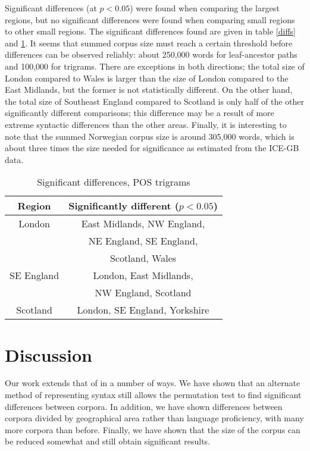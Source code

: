 \documentclass[11pt]{article}
\begin{document}
Significant differences (at $p < 0.05$) were found when
comparing the largest regions, but no significant differences were
found when comparing small regions to other small regions. The
significant differences found are given in table \ref{diffs} and
\ref{trigramdiffs}. It seems that summed corpus size must reach a
certain threshold before differences can be observed reliably: about 250,000
words for leaf-ancestor paths and 100,000 for trigrams. There are exceptions in
both directions; the total size of London compared to Wales is larger than
the size of  London
compared to the East Midlands, but the former is not statistically different.
On the other hand, the total size of Southeast England compared to
Scotland is only half of the other significantly different comparisons; this
difference may be a result of
more extreme syntactic differences than the other areas.
Finally, it is interesting to note that the summed Norwegian corpus
size is around 305,000 words, which is about three times the size needed
for significance as estimated from the ICE-GB data.

\begin{table}
  \begin{tabular}{|c|c|} \hline %
    Region & Significantly different ($p < 0.05$) \\ \hline
    London & East Midlands, NW England, \\
    & NE England, SE England,\\
    & Scotland, Wales \\ \hline
    SE England & London, East Midlands, \\
    & NW England, Scotland \\ \hline
    Scotland & London, SE England, Yorkshire \\ \hline
  \end{tabular}
  \label{trigramdiffs}
\caption{Significant differences, POS trigrams}
\end{table}

\section{Discussion}

Our work extends that of \cite{nerbonne06} in a number of ways. We
have shown that an alternate method of representing syntax still
allows the permutation test to find significant differences between
corpora. In addition, we have shown differences between corpora divided
by geographical area rather than language proficiency, with many more
corpora than before. Finally, we have shown that the size of the
corpus can be reduced somewhat and still obtain significant results.
\end{document}
